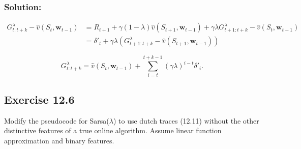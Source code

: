 \subsubsection*{Solution:}

\begin{align*}
    G_{t:t+k}^\lambda - \hat{v}(S_t, \mathbf{w}_{t-1}) &= R_{t+1} + \gamma (1 - \lambda) \hat{v}(S_{t+1}, \mathbf{w}_{t-1}) + \gamma \lambda G_{t+1:t+k}^\lambda  - \hat{v}(S_t, \mathbf{w}_{t-1})\\
    &= \delta'_t + \gamma \lambda \left( G_{t+1:t+k}^\lambda - \hat{v}(S_{t+1}, \mathbf{w}_{t-1}) \right)
\end{align*}

\[
    G_{t:t+k}^\lambda = \hat{v}(S_t, \mathbf{w}_{t-1}) + \sum_{i=t}^{t+k-1} (\gamma \lambda)^{i-t} \delta'_i.
\]


\subsection*{Exercise 12.6}
Modify the pseudocode for Sarsa($\lambda$) to use dutch traces (12.11) without the
other distinctive features of a true online algorithm. Assume linear function approximation
and binary features. 

